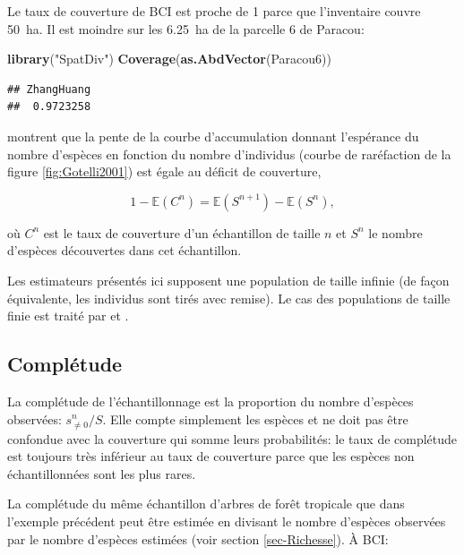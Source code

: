 \documentclass[
  11pt,
  french,
  a4paper,
  extrafontsizes,onecolumn,openright
  ]{memoir}
\newenvironment{Shaded}{\begin{snugshade}}{\end{snugshade}}
\newcommand{\FunctionTok}[1]{\textcolor[rgb]{0.13,0.29,0.53}{\textbf{#1}}}
\newcommand{\NormalTok}[1]{#1}
\newcommand{\StringTok}[1]{\textcolor[rgb]{0.31,0.60,0.02}{#1}}
\begin{document}
\normalsize

Le taux de couverture de BCI est proche de 1 parce que l'inventaire couvre 50~ha.
Il est moindre sur les 6.25~ha de la parcelle 6 de Paracou:

\scriptsize

\begin{Shaded}
\begin{Highlighting}[]
\FunctionTok{library}\NormalTok{(}\StringTok{"SpatDiv"}\NormalTok{)}
\FunctionTok{Coverage}\NormalTok{(}\FunctionTok{as.AbdVector}\NormalTok{(Paracou6))}
\end{Highlighting}
\end{Shaded}

\begin{verbatim}
## ZhangHuang 
##  0.9723258
\end{verbatim}

\normalsize

\textcite{Chao2012b} montrent que la pente de la courbe d'accumulation donnant l'espérance du nombre d'espèces en fonction du nombre d'individus (courbe de raréfaction de la figure \ref{fig:Gotelli2001}) est égale au déficit de couverture,

\begin{equation}
  \label{eq:DefC}
  1-{\mathbb E}\left(C^{n}\right)={\mathbb E}\left(S^{n+1}\right)-{\mathbb E}\left(S^{n}\right),
\end{equation}

où \(C^{n}\) est le taux de couverture d'un échantillon de taille \(n\) et \(S^{n}\) le nombre d'espèces découvertes dans cet échantillon.

Les estimateurs présentés ici supposent une population de taille infinie (de façon équivalente, les individus sont tirés avec remise).
Le cas des populations de taille finie est traité par \textcite{Chao2012} et \textcite{Hwang2014}.

\subsection{Complétude}\label{compluxe9tude}

La complétude de l'échantillonnage est la proportion du nombre d'espèces observées: \(s^{n}_{\ne 0}/{S}\).
Elle compte simplement les espèces et ne doit pas être confondue avec la couverture qui somme leurs probabilités: le taux de complétude est toujours très inférieur au taux de couverture parce que les espèces non échantillonnées sont les plus rares.

La complétude du même échantillon d'arbres de forêt tropicale que dans l'exemple précédent peut être estimée en divisant le nombre d'espèces observées par le nombre d'espèces estimées (voir section \ref{sec-Richesse}).
À BCI:
\end{document}
